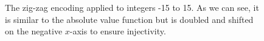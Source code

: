 \begin{figure}
\centering

\caption{\label{fig:zigzag}The zig-zag encoding applied to integers -15 to 15. As we can see, it is similar to the absolute value function but is doubled and shifted on the negative $x$-axis to ensure injectivity.}
\end{figure}
